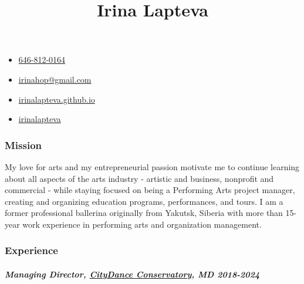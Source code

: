 \documentclass[
  letterpaper,
  DIV=11,
  numbers=noendperiod]{scrartcl}
\title{Irina Lapteva}
\author{}
\date{}
\let\oldsubparagraph\subparagraph
\renewcommand{\subparagraph}[1]{\oldsubparagraph{#1}\mbox{}}
\providecommand{\tightlist}{%
  \setlength{\itemsep}{0pt}\setlength{\parskip}{0pt}}\usepackage{longtable,booktabs,array}
\begin{document}
\maketitle

\begin{contact}

\begin{itemize}
\tightlist
\item
  \href{tel:646-812-0164}{646-812-0164}
\item
  \url{irinahop@gmail.com}
\item
  \href{https://irinalapteva.github.io}{irinalapteva.github.io}
\item
  \href{https://www.linkedin.com/in/irinalapteva}{irinalapteva}
\end{itemize}

\end{contact}

\subsubsection{Mission}\label{mission}

My love for arts and my entrepreneurial passion motivate me to continue
learning about all aspects of the arts industry - artistic and business,
nonprofit and commercial - while staying focused on being a Performing
Arts project manager, creating and organizing education programs,
performances, and tours. I am a former professional ballerina originally
from Yakutsk, Siberia with more than 15-year work experience in
performing arts and organization management.

\subsubsection{Experience}\label{experience}

\subparagraph{\texorpdfstring{{Managing Director},
\href{https://www.citydance.net/sac/leadership-staff/}{CityDance
Conservatory}, MD
{2018-2024}}{Managing Director, CityDance Conservatory, MD 2018-2024}}\label{managing-director-citydance-conservatory-md-2018-2024}
\end{document}
